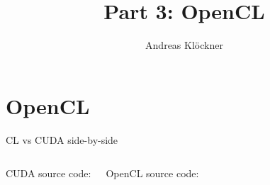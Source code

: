 \documentclass[english,compress]{beamer}
\begin{document}

\title{Part 3: OpenCL}

\author{Andreas Klöckner}


\frame{
  \titlepage
}
\section{OpenCL}
%



\begin{nologo}
\begin{frame}{CL vs CUDA side-by-side}
  \begin{columns}
      CUDA source code:
      
      OpenCL source code:
      
  \end{columns}
\end{frame}
\end{nologo}



%
%

\end{document}

